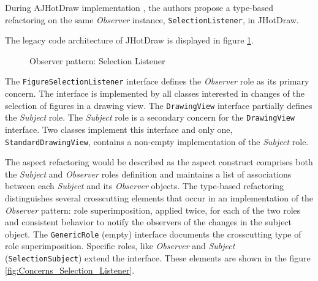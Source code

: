 During AJHotDraw implementation\cite{marin2005approach} \cite{hannemann2005role}, the authors propose a type-based refactoring on the same \textit{Observer} instance, \texttt{SelectionListener}, in JHotDraw. 

The legacy code architecture of JHotDraw is displayed in figure \ref{fig:Selection_Listener}.

\begin{figure}[H]
	\centering
  	\caption{Observer pattern: Selection Listener \cite{marin2005approach}}
  	\label{fig:Selection_Listener}
\end{figure}

The \texttt{FigureSelectionListener} interface defines the \textit{Observer} role as its primary concern. 
The interface is implemented by all classes interested in changes of the selection of figures in a drawing view. 
The \texttt{DrawingView} interface partially defines the \textit{Subject} role. 
The \textit{Subject} role is a secondary concern for the \texttt{DrawingView} interface. 
Two classes implement this interface and only one, \texttt{StandardDrawingView}, contains a non-empty implementation of the \textit{Subject} role.

The aspect refactoring would be described as the aspect construct comprises both the \textit{Subject} and \textit{Observer} roles definition and maintains a list of associations between each \textit{Subject} and its \textit{Observer} objects.
The type-based refactoring\cite{marin2005approach} distinguishes several crosscutting elements that occur in an implementation of the \textit{Observer} pattern: role superimposition, applied twice, for each of the two roles and consistent behavior to notify the observers of the changes in the subject object. 
The \texttt{GenericRole} (empty) interface documents the crosscutting type of role superimposition. 
Specific roles, like \textit{Observer} and \textit{Subject} (\texttt{SelectionSubject}) extend the interface.
These elements are shown in the figure \ref{fig:Concerns_Selection_Listener}.

